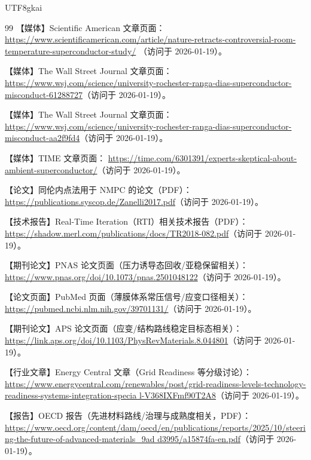 \documentclass[12pt]{article}
\begin{document}
\begin{CJK*}{UTF8}{gkai}
\begin{thebibliography}{99}
【媒体】Scientific American 文章页面：
\url{https://www.scientificamerican.com/article/nature-retracts-controversial-room-temperature-superconductor-study/}
  （访问于 2026-01-19）。

【媒体】The Wall Street Journal 文章页面：
\url{https://www.wsj.com/science/university-rochester-ranga-dias-superconductor-misconduct-61288727}（访问于 2026-01-19）。

【媒体】The Wall Street Journal 文章页面：
\url{https://www.wsj.com/science/university-rochester-ranga-dias-superconductor-misconduct-aa2f9fd4}（访问于 2026-01-19）。

【媒体】TIME 文章页面：
\url{https://time.com/6301391/experts-skeptical-about-ambient-superconductor/}（访问于 2026-01-19）。

【论文】同伦内点法用于 NMPC 的论文（PDF）：
\url{https://publications.syscop.de/Zanelli2017.pdf}（访问于 2026-01-19）。

【技术报告】Real-Time Iteration（RTI）相关技术报告（PDF）：
\url{https://shadow.merl.com/publications/docs/TR2018-082.pdf}（访问于 2026-01-19）。

【期刊论文】PNAS 论文页面（压力诱导态回收/亚稳保留相关）：
\url{https://www.pnas.org/doi/10.1073/pnas.2501048122}（访问于 2026-01-19）。

【论文页面】PubMed 页面（薄膜体系常压信号/应变口径相关）：
\url{https://pubmed.ncbi.nlm.nih.gov/39701131/}（访问于 2026-01-19）。

【期刊论文】APS 论文页面（应变/结构路线稳定目标态相关）：
\url{https://link.aps.org/doi/10.1103/PhysRevMaterials.8.044801}（访问于 2026-01-19）。

【行业文章】Energy Central 文章（Grid Readiness 等分级讨论）：
\url{https://www.energycentral.com/renewables/post/grid-readiness-levels-technology-readiness-systems-integration-specia
  l-V368IXFmf90T2A8}（访问于 2026-01-19）。

【报告】OECD 报告（先进材料路线/治理与成熟度相关，PDF）：
\url{https://www.oecd.org/content/dam/oecd/en/publications/reports/2025/10/steering-the-future-of-advanced-materials_9ad
  d3995/a15874fa-en.pdf}（访问于 2026-01-19）。


\end{thebibliography}
\end{CJK*}
\end{document}
